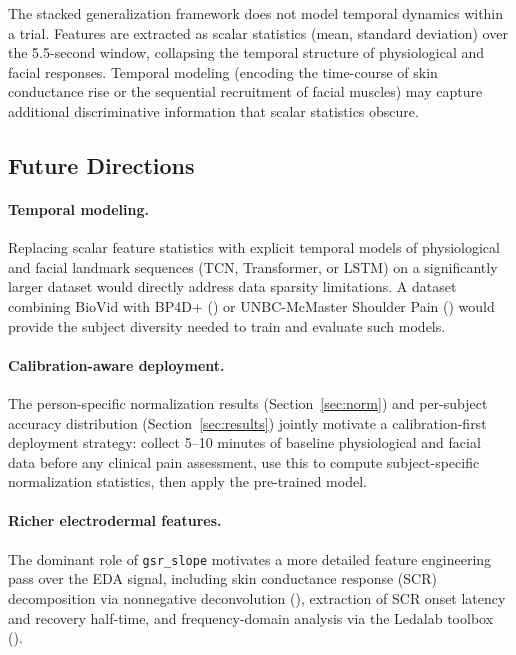 \documentclass[10pt, twocolumn]{article}
\begin{document}
The stacked generalization framework does not model temporal dynamics within a trial.
Features are extracted as scalar statistics (mean, standard deviation) over the 5.5-second
window, collapsing the temporal structure of physiological and facial responses. Temporal
modeling (encoding the time-course of skin conductance rise or the sequential recruitment
of facial muscles) may capture additional discriminative information that scalar statistics
obscure.

\subsection{Future Directions}

\paragraph{Temporal modeling.}
Replacing scalar feature statistics with explicit temporal models of physiological and
facial landmark sequences (TCN, Transformer, or LSTM) on a significantly larger dataset
would directly address data sparsity limitations. A dataset combining BioVid with BP4D+
(\cite{Zhang2016}) or UNBC-McMaster Shoulder Pain (\cite{Lucey2011}) would provide the
subject diversity needed to train and evaluate such models.

\paragraph{Calibration-aware deployment.}
The person-specific normalization results (Section~\ref{sec:norm}) and per-subject accuracy
distribution (Section~\ref{sec:results}) jointly motivate a calibration-first deployment
strategy: collect 5--10 minutes of baseline physiological and facial data before any
clinical pain assessment, use this to compute subject-specific normalization statistics,
then apply the pre-trained model.

\paragraph{Richer electrodermal features.}
The dominant role of \texttt{gsr\_slope} motivates a more detailed feature engineering pass
over the EDA signal, including skin conductance response (SCR) decomposition via nonnegative
deconvolution (\cite{Greco2016}), extraction of SCR onset latency and recovery half-time,
and frequency-domain analysis via the Ledalab toolbox (\cite{Benedek2010}).
\end{document}
